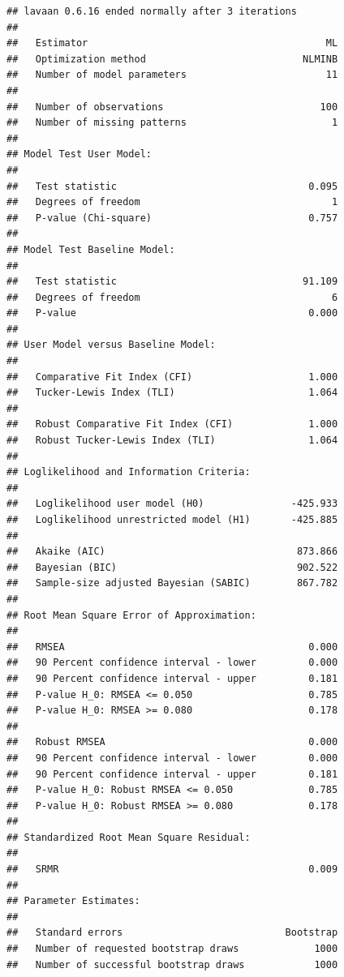 \documentclass[
  11pt,
]{book}
\begin{document}
\begin{verbatim}
## lavaan 0.6.16 ended normally after 3 iterations
## 
##   Estimator                                         ML
##   Optimization method                           NLMINB
##   Number of model parameters                        11
## 
##   Number of observations                           100
##   Number of missing patterns                         1
## 
## Model Test User Model:
##                                                       
##   Test statistic                                 0.095
##   Degrees of freedom                                 1
##   P-value (Chi-square)                           0.757
## 
## Model Test Baseline Model:
## 
##   Test statistic                                91.109
##   Degrees of freedom                                 6
##   P-value                                        0.000
## 
## User Model versus Baseline Model:
## 
##   Comparative Fit Index (CFI)                    1.000
##   Tucker-Lewis Index (TLI)                       1.064
##                                                       
##   Robust Comparative Fit Index (CFI)             1.000
##   Robust Tucker-Lewis Index (TLI)                1.064
## 
## Loglikelihood and Information Criteria:
## 
##   Loglikelihood user model (H0)               -425.933
##   Loglikelihood unrestricted model (H1)       -425.885
##                                                       
##   Akaike (AIC)                                 873.866
##   Bayesian (BIC)                               902.522
##   Sample-size adjusted Bayesian (SABIC)        867.782
## 
## Root Mean Square Error of Approximation:
## 
##   RMSEA                                          0.000
##   90 Percent confidence interval - lower         0.000
##   90 Percent confidence interval - upper         0.181
##   P-value H_0: RMSEA <= 0.050                    0.785
##   P-value H_0: RMSEA >= 0.080                    0.178
##                                                       
##   Robust RMSEA                                   0.000
##   90 Percent confidence interval - lower         0.000
##   90 Percent confidence interval - upper         0.181
##   P-value H_0: Robust RMSEA <= 0.050             0.785
##   P-value H_0: Robust RMSEA >= 0.080             0.178
## 
## Standardized Root Mean Square Residual:
## 
##   SRMR                                           0.009
## 
## Parameter Estimates:
## 
##   Standard errors                            Bootstrap
##   Number of requested bootstrap draws             1000
##   Number of successful bootstrap draws            1000

\end{verbatim}
\end{document}
